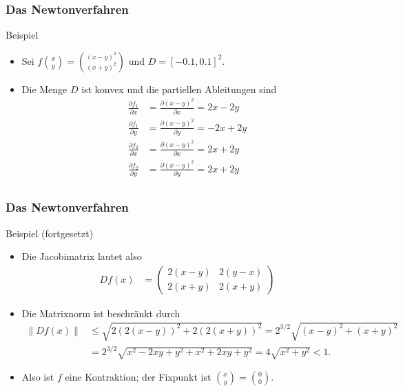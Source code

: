 \documentclass{beamer}
\renewcommand{\ae}{\"a}
\newcommand{\mytitle}{Das Newtonverfahren}
\begin{document}
\begin{frame}\frametitle{\mytitle}
	\begin{block}{Beispiel}
		\begin{itemize}
			\item Sei $f\binom xy=\binom{(x-y)^2}{(x+y)^2}$ und $D=[-0.1,0.1]^2$.
			\item Die Menge $D$ ist konvex und die partiellen Ableitungen sind
				\begin{align*}
					\frac{\partial f_1}{\partial x}&=\frac{\partial(x-y)^2}{\partial x}=2x-2y\\
					\frac{\partial f_1}{\partial y}&=\frac{\partial(x-y)^2}{\partial y}=-2x+2y\\
					\frac{\partial f_2}{\partial x}&=\frac{\partial(x-y)^2}{\partial x}=2x+2y\\
					\frac{\partial f_2}{\partial y}&=\frac{\partial(x-y)^2}{\partial y}=2x+2y\\
				\end{align*}
		\end{itemize}
	\end{block}
\end{frame}

\begin{frame}\frametitle{\mytitle}
	\begin{block}{Beispiel (fortgesetzt)}
		\begin{itemize}
			\item Die Jacobimatrix lautet also
				\begin{align*}
					Df(x)&=\begin{pmatrix}
						2(x-y)&2(y-x)\\2(x+y)&2(x+y)
					\end{pmatrix}
				\end{align*}
			\item Die Matrixnorm ist beschr\ae nkt durch
				\begin{align*}
					\|Df(x)\|&\leq\sqrt{2(2(x-y))^2+2(2(x+y))^2}=2^{3/2}\sqrt{(x-y)^2+(x+y)^2}\\
							 &=2^{3/2}\sqrt{x^2-2xy+y^2+x^2+2xy+y^2}=4\sqrt{x^2+y^2}<1.
				\end{align*}
			\item Also ist $f$ eine Kontraktion; der Fixpunkt ist $\binom xy=\binom 00$.
		\end{itemize}
	\end{block}
\end{frame}
\end{document}
